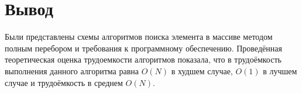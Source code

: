 \section*{Вывод}
Были представлены схемы алгоритмов поиска элемента в массиве методом полным перебором и требования к программному обеспечению.
Проведённая теоретическая оценка трудоемкости алгоритмов показала, что в трудоёмкость выполнения данного алгоритма равна $O(N)$ в худшем случае, $O(1)$ в лучшем случае и трудоёмкость в среднем $O(N)$.
